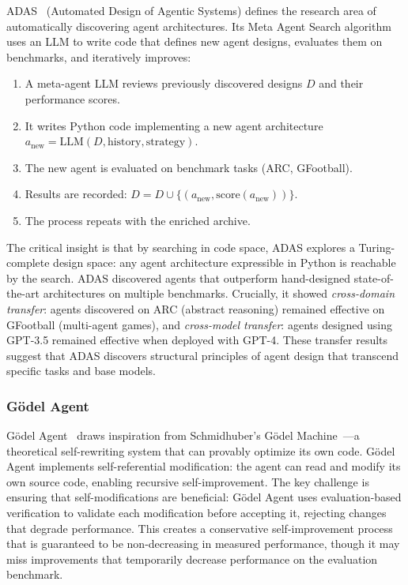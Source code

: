 \documentclass[11pt,a4paper]{article}
\begin{document}
ADAS~\citep{hu2024adas} (Automated Design of Agentic Systems) defines the research area of automatically discovering agent architectures. Its Meta Agent Search algorithm uses an LLM to write code that defines new agent designs, evaluates them on benchmarks, and iteratively improves:

\begin{enumerate}
\item A meta-agent LLM reviews previously discovered designs $D$ and their performance scores.
\item It writes Python code implementing a new agent architecture $a_{\text{new}} = \text{LLM}(D, \text{history}, \text{strategy})$.
\item The new agent is evaluated on benchmark tasks (ARC, GFootball).
\item Results are recorded: $D = D \cup \{(a_{\text{new}}, \text{score}(a_{\text{new}}))\}$.
\item The process repeats with the enriched archive.
\end{enumerate}

The critical insight is that by searching in code space, ADAS explores a Turing-complete design space: any agent architecture expressible in Python is reachable by the search. ADAS discovered agents that outperform hand-designed state-of-the-art architectures on multiple benchmarks. Crucially, it showed \emph{cross-domain transfer}: agents discovered on ARC (abstract reasoning) remained effective on GFootball (multi-agent games), and \emph{cross-model transfer}: agents designed using GPT-3.5 remained effective when deployed with GPT-4. These transfer results suggest that ADAS discovers structural principles of agent design that transcend specific tasks and base models.

\subsubsection{G\"{o}del Agent}

G\"{o}del Agent~\citep{yin2024godel} draws inspiration from Schmidhuber's G\"{o}del Machine~\citep{schmidhuber2003godel}---a theoretical self-rewriting system that can provably optimize its own code. G\"{o}del Agent implements self-referential modification: the agent can read and modify its own source code, enabling recursive self-improvement. The key challenge is ensuring that self-modifications are beneficial: G\"{o}del Agent uses evaluation-based verification to validate each modification before accepting it, rejecting changes that degrade performance. This creates a conservative self-improvement process that is guaranteed to be non-decreasing in measured performance, though it may miss improvements that temporarily decrease performance on the evaluation benchmark.
\end{document}
